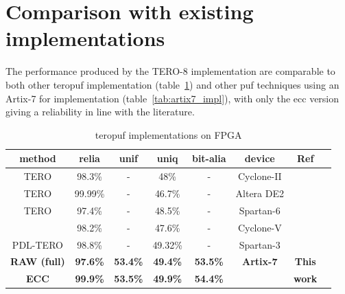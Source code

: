 \newpage
\section{Comparison with existing implementations}

The performance produced by the TERO-8 implementation are comparable to both other \acrshort{teropuf} implementation (table~\ref{tab:tero_impls}) and other \acrshort{puf} techniques using an Artix-7 for implementation (table~\ref{tab:artix7_impl}), with only the \acrshort{ecc} version giving a reliability in line with the literature. 

\begin{table}[H]
    \centering
    \begin{tabular}{|c|c|c|c|c|c|c|c|}
         \hline
         \textbf{method} & \textbf{\acrshort{relia}} & \textbf{\acrshort{unif}} & \textbf{\acrshort{uniq}} & \textbf{\acrshort{bit-alia}} & \textbf{device} & \textbf{Ref}\\
         \hline\hline
         TERO & 98.3\% & - & 48\% & - & Cyclone-II & \cite{bossuet_puf_2014}\\
         \hline\hline
         TERO & 99.99\% & - & 46.7\% & - & Altera DE2 & \cite{bossuet_puf_2014}\\
         \hline
         TERO & 97.4\% & - & 48.5\% & - & Spartan-6 & \cite{marchand_implementation_2017}\\
          & 98.2\% & - & 47.6\% & - & Cyclone-V & \\
         \hline
         PDL-TERO & 98.8\% & - & 49.32\% & - & Spartan-3 & \cite{ardakani_improving_2018}\\
         \hline\hline
         \textbf{RAW (full)} & \textbf{97.6\%} & \textbf{53.4\%} & \textbf{49.4\%} & \textbf{53.5\%} & \textbf{Artix-7} & \textbf{This}\\ 
         \textbf{ECC} & \textbf{99.9\%} & \textbf{53.5\%} & \textbf{49.9\%} & \textbf{54.4\%} & & \textbf{work}\\
         \hline
    \end{tabular}
    \caption{\acrshort{teropuf} implementations on FPGA}
    \label{tab:tero_impls}
\end{table}



